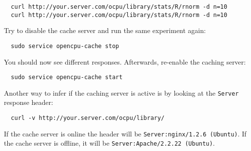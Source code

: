 \documentclass{scrartcl}\usepackage[]{graphicx}\usepackage[]{color}
\begin{document}
\begin{verbatim}
  curl http://your.server.com/ocpu/library/stats/R/rnorm -d n=10
  curl http://your.server.com/ocpu/library/stats/R/rnorm -d n=10
\end{verbatim}
Try to disable the cache server and run the same experiment again:
\begin{verbatim}
  sudo service opencpu-cache stop
\end{verbatim}
You should now see different responses. Afterwards, re-enable the caching server:
\begin{verbatim}
  sudo service opencpu-cache start
\end{verbatim}
Another way to infer if the caching server is active is by looking at the \texttt{Server} response header:
\begin{verbatim}
  curl -v http://your.server.com/ocpu/library/
\end{verbatim}
If the cache server is online the header will be \texttt{Server:nginx/1.2.6 (Ubuntu)}. If the cache server is offline, it will be \texttt{Server:Apache/2.2.22 (Ubuntu)}.
\end{document}
